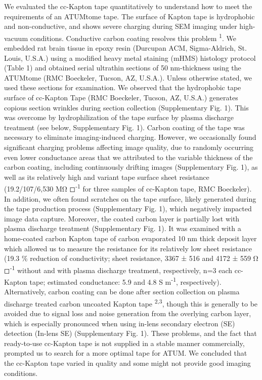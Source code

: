 \documentclass{article}
\begin{document}
We evaluated the cc-Kapton tape quantitatively to understand how to meet the requirements of an ATUMtome tape. The surface of Kapton tape is hydrophobic and non-conductive, and shows severe charging during SEM imaging under high-vacuum conditions. Conductive carbon coating resolves this problem \textsuperscript{1}. We embedded rat brain tissue in epoxy resin (Durcupan ACM, Sigma-Aldrich, St. Louis, U.S.A.) using a modified heavy metal staining (mHMS) histology protocol (Table 1) and obtained serial ultrathin sections of 50 nm-thickness using the ATUMtome (RMC Boeckeler, Tucson, AZ, U.S.A.). Unless otherwise stated, we used these sections for examination. We observed that the hydrophobic tape surface of cc-Kapton Tape (RMC Boeckeler, Tucson, AZ, U.S.A.) generates copious section wrinkles during section collection (Supplementary Fig. 1). This was overcome by hydrophilization of the tape surface by plasma discharge treatment (see below, Supplementary Fig. 1). Carbon coating of the tape was necessary to eliminate imaging-induced charging. However, we occasionally found significant charging problems affecting image quality, due to randomly occurring even lower conductance areas that we attributed to the variable thickness of the carbon coating, including continuously drifting images (Supplementary Fig. 1), as well as its relatively high and variant tape surface sheet resistance (19.2/107/6,530 MΩ ◻\textsuperscript{-1} for three samples of cc-Kapton tape, RMC Boeckeler). In addition, we often found scratches on the tape surface, likely generated during the tape production process (Supplementary Fig. 1), which negatively impacted image data capture. Moreover, the coated carbon layer is partially lost with plasma discharge treatment (Supplementary Fig. 1). It was examined with a home-coated carbon Kapton tape of carbon evaporated 10 nm thick deposit layer which allowed us to measure the resistance for its relatively low sheet resistance (19.3 \% reduction of conductivity; sheet resistance, 3367 ± 516 and 4172 ± 559 Ω ◻\textsuperscript{-1} without and with plasma discharge treatment, respectively, n=3 each cc-Kapton tape; estimated conductance: 5.9 and 4.8 S m\textsuperscript{-1}, respectively). Alternatively, carbon coating can be done after section collection on plasma discharge treated carbon uncoated Kapton tape \textsuperscript{2,3}, though this is generally to be avoided due to signal loss and noise generation from the overlying carbon layer, which is especially pronounced when using in-lens secondary electron (SE) detection (In-lens SE) (Supplementary Fig. 1). These problems, and the fact that ready-to-use cc-Kapton tape is not supplied in a stable manner commercially, prompted us to search for a more optimal tape for ATUM. We 
concluded that the cc-Kapton tape varied in quality and some might not provide good imaging conditions.
\end{document}
